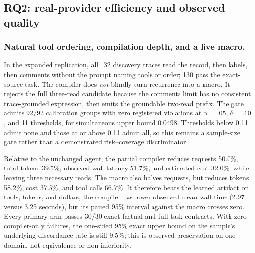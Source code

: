 \subsection{RQ2: real-provider efficiency and observed quality}
\label{sec:rq2}

\subsubsection{Natural tool ordering, compilation depth, and a live macro.}
In the expanded replication, all 132 discovery traces read the record, then labels, then
comments without the prompt
naming tools or order; 130 pass the exact-source task.  The compiler does \emph{not}
blindly turn recurrence into a macro.  It rejects the full three-read candidate because
the comments limit has no consistent trace-grounded expression, then emits the groundable
two-read prefix.  The gate admits 92/92 calibration groups with zero registered violations
at $\alpha=.05$, $\delta=.10$, and 11 thresholds, for simultaneous upper bound 0.0498.
Thresholds below 0.11 admit none and those at or above 0.11 admit all, so this remains a
sample-size gate rather than a demonstrated risk--coverage discriminator.

\begin{table}[t]
  \centering
  \caption{Expanded natural-order Tier-2 replication on 30 fresh public issue records with
  live provider calls and all six condition orders balanced five times.  Means use primary
  pairs only.  Exact pass checks source-grounded fields; every arm also passes the safe-read
  task contract 30/30.}
  \label{tab:natural-replication}
  \resizebox{\textwidth}{!}{}
\end{table}

Relative to the unchanged agent, the partial compiler reduces requests 50.0\%, total
tokens 39.5\%, observed wall latency 51.7\%, and estimated cost 32.0\%, while leaving
three necessary reads.  The macro also halves requests, but reduces tokens 58.2\%, cost
37.5\%, and tool calls 66.7\%.  It therefore beats the learned artifact on tools, tokens,
and dollars; the compiler has lower observed mean wall time (2.97 versus 3.25 seconds),
but its paired 95\% interval against the macro crosses zero.  Every primary arm passes
30/30 exact factual and full task contracts.  With zero compiler-only failures, the
one-sided 95\% exact upper bound on the sample's underlying discordance rate is still
9.5\%; this is observed preservation on one domain, not equivalence or non-inferiority.

